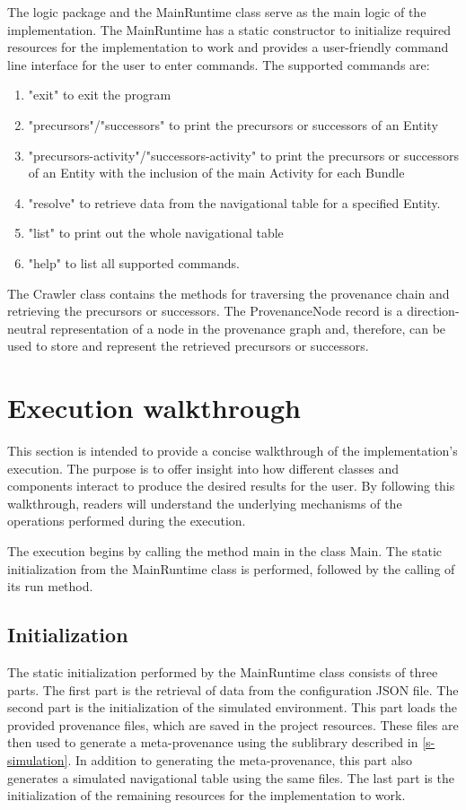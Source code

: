 \documentclass[
  digital,     %
  oneside,     %
  nosansbold,  %
  nocolorbold, %
  lof,         %
  lot,         %
]{fithesis4}
\begin{document}
The logic package and the MainRuntime class serve as the main logic of the implementation. The MainRuntime has a static constructor to initialize required resources for the implementation to work and provides a user-friendly command line interface for the user to enter commands. The supported commands are:

\begin{enumerate}
    \item "exit" to exit the program
    \item "precursors"/"successors" to print the precursors or successors of an Entity
    \item "precursors-activity"/"successors-activity" to print the precursors or successors of an Entity with the inclusion of the main Activity for each Bundle
    \item "resolve" to retrieve data from the navigational table for a specified Entity.
    \item "list" to print out the whole navigational table
    \item "help" to list all supported commands.
\end{enumerate}

The Crawler class contains the methods for traversing the provenance chain and retrieving the precursors or successors. The ProvenanceNode record is a direction-neutral representation of a node in the provenance graph and, therefore, can be used to store and represent the retrieved precursors or successors.

\section{Execution walkthrough}
This section is intended to provide a concise walkthrough of the implementation's execution. The purpose is to offer insight into how different classes and components interact to produce the desired results for the user. By following this walkthrough, readers will understand the underlying mechanisms of the operations performed during the execution. 

The execution begins by calling the method main in the class Main. The static initialization from the MainRuntime class is performed, followed by the calling of its run method.

\subsection{Initialization}
The static initialization performed by the MainRuntime class consists of three parts. The first part is the retrieval of data from the configuration JSON file. The second part is the initialization of the simulated environment. This part loads the provided provenance files, which are saved in the project resources. These files are then used to generate a meta-provenance using the sublibrary described in \ref{s-simulation}. In addition to generating the meta-provenance, this part also generates a simulated navigational table using the same files. The last part is the initialization of the remaining resources for the implementation to work.
\end{document}
